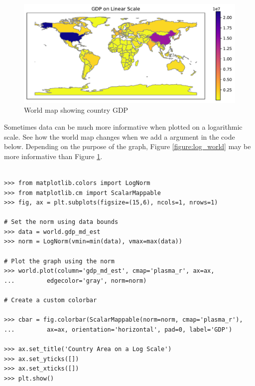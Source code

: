 \begin{figure}[H]
\begin{center}
\includegraphics[scale=.75]{figures/world_linear.pdf}
\end{center}
\caption{World map showing country GDP}
\label{figure:linear_world}
\end{figure}

Sometimes data can be much more informative when plotted on a logarithmic scale.
See how the world map changes when we add a  argument in the code below.
Depending on the purpose of the graph, Figure \ref{figure:log_world} may be more informative than Figure \ref{figure:linear_world}.

\begin{lstlisting}

>>> from matplotlib.colors import LogNorm
>>> from matplotlib.cm import ScalarMappable
>>> fig, ax = plt.subplots(figsize=(15,6), ncols=1, nrows=1)

# Set the norm using data bounds
>>> data = world.gdp_md_est
>>> norm = LogNorm(vmin=min(data), vmax=max(data))

# Plot the graph using the norm
>>> world.plot(column='gdp_md_est', cmap='plasma_r', ax=ax,
...			edgecolor='gray', norm=norm)

# Create a custom colorbar

>>> cbar = fig.colorbar(ScalarMappable(norm=norm, cmap='plasma_r'),
...			ax=ax, orientation='horizontal', pad=0, label='GDP')

>>> ax.set_title('Country Area on a Log Scale')
>>> ax.set_yticks([])
>>> ax.set_xticks([])
>>> plt.show()
\end{lstlisting}

